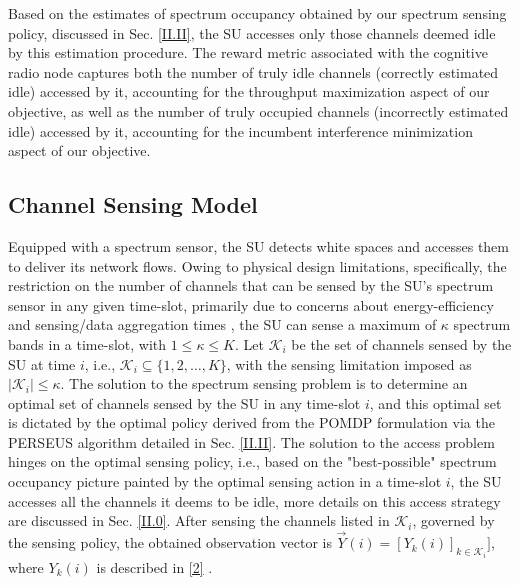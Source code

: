 \documentclass[12pt, draftcls, onecolumn]{IEEEtran}
\begin{document}
Based on the estimates of spectrum occupancy obtained by our spectrum sensing policy, discussed in Sec. \ref{II.II}, the SU accesses only those channels deemed idle by this estimation procedure. The reward metric associated with the cognitive radio node captures both the number of truly idle channels (correctly estimated idle) accessed by it, accounting for the throughput maximization aspect of our objective, as well as the number of truly occupied channels (incorrectly estimated idle) accessed by it, accounting for the incumbent interference minimization aspect of our objective.

\subsection{Channel Sensing Model}\label{I.III}
Equipped with a spectrum sensor, the SU detects white spaces and accesses them to deliver its network flows. Owing to physical design limitations, specifically, the restriction on the number of channels that can be sensed by the SU's spectrum sensor in any given time-slot, primarily due to concerns about energy-efficiency and sensing/data aggregation times \cite{WCL:3}, the SU can sense a maximum of $\kappa$ spectrum bands in a time-slot, with $1{\leq}\kappa{\leq}K$. Let $\mathcal{K}_{i}$ be the set of channels sensed by the SU at time $i$, i.e., $\mathcal{K}_{i}{\subseteq}\{1,2,\dots,K\}$, with the sensing limitation imposed as $|\mathcal{K}_{i}|{\leq}\kappa$. The solution to the spectrum sensing problem is to determine an optimal set of channels sensed by the SU in any time-slot $i$, and this optimal set is dictated by the optimal policy derived from the POMDP formulation via the PERSEUS algorithm detailed in Sec. \ref{II.II}. The solution to the access problem hinges on the optimal sensing policy, i.e., based on the "best-possible" spectrum occupancy picture painted by the optimal sensing action in a time-slot $i$, the SU accesses all the channels it deems to be idle, more details on this access strategy are discussed in Sec. \ref{II.0}. After sensing the channels listed in $\mathcal{K}_{i}$, governed by the sensing policy, the obtained observation vector is $\vec{Y}(i){=}[Y_{k}(i)]_{k{\in}\mathcal{K}_{i}}]$, where $Y_{k}(i)$ is described in \eqref{2} .
\end{document}
